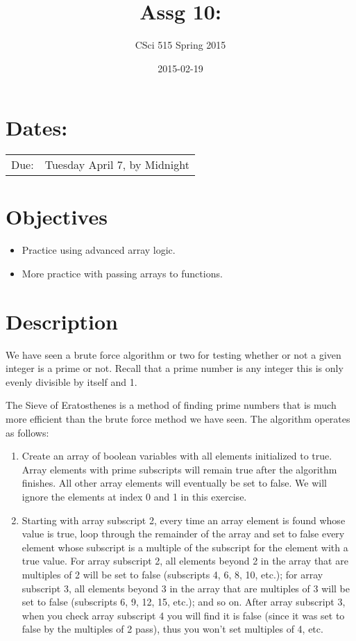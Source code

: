 \documentclass[11pt]{article}
\title{Assg 10:}
\author{CSci 515 Spring 2015}
\date{2015-02-19}
\begin{document}
\maketitle


\section*{Dates:}
\label{sec-1}


\begin{center}
\begin{tabular}{ll}
 Due:  &  Tuesday April 7, by Midnight  \\
\end{tabular}
\end{center}
\section*{Objectives}
\label{sec-2}

\begin{itemize}
\item Practice using advanced array logic.
\item More practice with passing arrays to functions.
\end{itemize}
\section*{Description}
\label{sec-3}

We have seen a brute force algorithm or two for testing whether or not
a given integer is a prime or not.  Recall that a prime number is any
integer this is only evenly divisible by itself and 1.  

The Sieve of Eratosthenes is a method of finding prime numbers that
is much more efficient than the brute force method we have seen.
The algorithm operates as follows:

\begin{enumerate}
\item Create an array of boolean variables with all elements initialized
   to true.  Array elements with prime subscripts will remain true
   after the algorithm finishes.  All other array elements will
   eventually be set to false.  We will ignore the elements at index 0
   and 1 in this exercise.
\item Starting with array subscript 2, every time an array element is
   found whose value is true, loop through the remainder of the array
   and set to false every element whose subscript is a multiple of the
   subscript for the element with a true value.  For array subscript
   2, all elements beyond 2 in the array that are multiples of 2 will
   be set to false (subscripts 4, 6, 8, 10, etc.); for array subscript 
   3, all elements beyond 3 in the array that are multiples of 3 will be
   set to false (subscripts 6, 9, 12, 15, etc.); and so on.  After
   array subscript 3, when you check array subscript 4 you will find it
   is false (since it was set to false by the multiples of 2 pass), thus
   you won't set multiples of 4, etc.
\end{enumerate}
\end{document}
